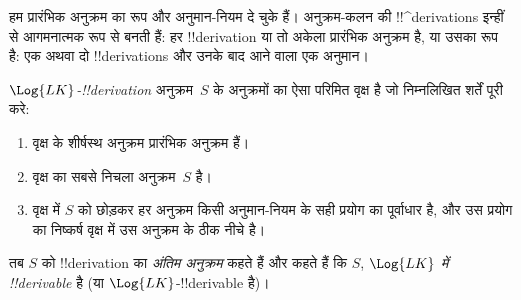 \documentclass[../../../include/open-logic-section]{subfiles}
\begin{document}
      {}
      {}


\begin{explain}
हम प्रारंभिक अनुक्रम का रूप और अनुमान-नियम दे चुके हैं। अनुक्रम-कलन की
!!^{derivation}s इन्हीं से आगमनात्मक रूप से बनती हैं: हर !!{derivation} या तो
अकेला प्रारंभिक अनुक्रम है, या उसका रूप है: एक अथवा दो !!{derivation}s और
उनके बाद आने वाला एक अनुमान।
\end{explain}

\begin{defn}
\emph{$\Log{LK}$-!!{derivation}} अनुक्रम~$S$ के अनुक्रमों का ऐसा परिमित वृक्ष
है जो निम्नलिखित शर्तें पूरी करे:
\begin{enumerate}
\item वृक्ष के शीर्षस्थ अनुक्रम प्रारंभिक अनुक्रम हैं।
\item वृक्ष का सबसे निचला अनुक्रम~$S$ है।
\item वृक्ष में $S$ को छोड़कर हर अनुक्रम किसी अनुमान-नियम के सही प्रयोग का
  पूर्वाधार है, और उस प्रयोग का निष्कर्ष वृक्ष में उस अनुक्रम के ठीक नीचे है।
\end{enumerate}
तब $S$ को !!{derivation} का \emph{अंतिम अनुक्रम} कहते हैं और कहते हैं कि $S$,
\emph{$\Log{LK}$ में !!{derivable}} है (या $\Log{LK}$-!!{derivable} है)।
\end{defn}
\end{document}
